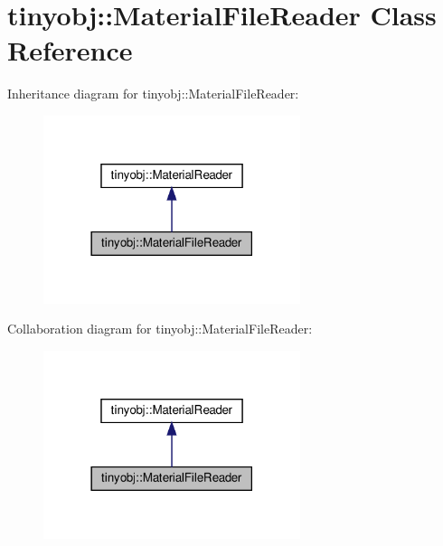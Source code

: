 \hypertarget{classtinyobj_1_1MaterialFileReader}{}\section{tinyobj\+:\+:Material\+File\+Reader Class Reference}
\label{classtinyobj_1_1MaterialFileReader}


Inheritance diagram for tinyobj\+:\+:Material\+File\+Reader\+:\nopagebreak
\begin{figure}[H]
\begin{center}
\leavevmode
\includegraphics[width=213pt]{classtinyobj_1_1MaterialFileReader__inherit__graph}
\end{center}
\end{figure}


Collaboration diagram for tinyobj\+:\+:Material\+File\+Reader\+:\nopagebreak
\begin{figure}[H]
\begin{center}
\leavevmode
\includegraphics[width=213pt]{classtinyobj_1_1MaterialFileReader__coll__graph}
\end{center}
\end{figure}

